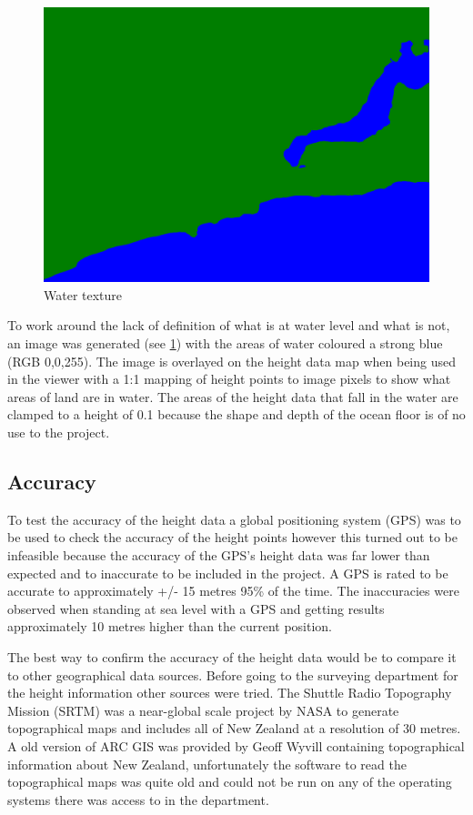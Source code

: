 \documentclass[12pt]{report}
\begin{document}
\begin{figure}
\includegraphics[scale=0.4]{terrain.png}
\caption{Water texture}
\label{overlaytexture}
\end{figure}
To work around the lack of definition of what is at water level and what is not, an image was generated (see \ref{overlaytexture}) with the areas of water coloured a strong blue (RGB 0,0,255). The image is overlayed on the height data map when being used in the viewer with a 1:1 mapping of height points to image pixels to show what areas of land are in water. The areas of the height data that fall in the water are clamped to a height of 0.1 because the shape and depth of the ocean floor is of no use to the project.


\subsection{Accuracy}
To test the accuracy of the height data a global positioning system (GPS) was to be used to check the accuracy of the height points however this turned out to be infeasible because the accuracy of the GPS's height data was far lower than expected and to inaccurate to be included in the project. A GPS is rated to be accurate to approximately +/- 15 metres 95\% of the time\cite{gpsaltitude}. The inaccuracies were observed when standing at sea level with a GPS and getting results approximately 10 metres higher than the current position.

The best way to confirm the accuracy of the height data would be to compare it to other geographical data sources. Before going to the surveying department for the height information other sources were tried. The Shuttle Radio Topography Mission (SRTM)\cite{srtm} was a near-global scale project by NASA to generate topographical maps and includes all of New Zealand at a resolution of 30 metres. A old version of ARC GIS was provided by Geoff Wyvill containing topographical information about New Zealand, unfortunately the software to read the topographical maps was quite old and could not be run on any of the operating systems there was access to in the department.
\end{document}
